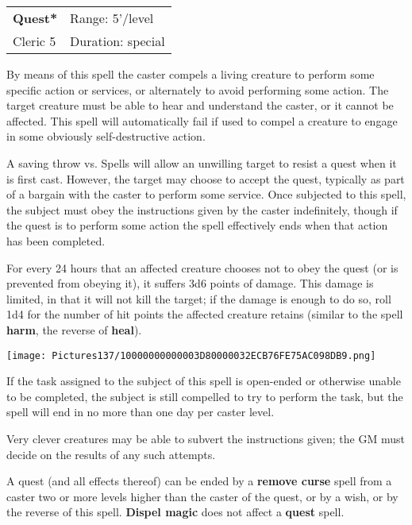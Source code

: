 \documentclass[a4paper,twoside,openany,10pt]{book}
\begin{document}
\begin{multicols}{2}
\smallskip\begin{flushleft} 
	\begin{tabularx}{0.45\textwidth}{@{}m{3.5cm}m{5.5cm}@{}} 
		\textbf{Quest*} & Range: 5'/level\\
Cleric 5 &Duration: special\\
	\end{tabularx}\end{flushleft}

By means of this spell the caster compels a living creature to perform some specific action or services, or alternately to avoid performing some action. The target creature must be able to hear and understand the caster, or it cannot be affected. This spell will automatically fail if used to compel a creature to engage in some obviously self-destructive action.

A saving throw vs. Spells will allow an unwilling target to resist a quest when it is first cast. However, the target may choose to accept the quest, typically as part of a bargain with the caster to perform some service. Once subjected to this spell, the subject must obey the instructions given by the caster indefinitely, though if the quest is to perform some action the spell effectively ends when that action has been completed.

For every 24 hours that an affected creature chooses not to obey the quest (or is prevented from obeying it), it suffers 3d6 points of damage. This damage is limited, in that it will not kill the target; if the damage is enough to do so, roll 1d4 for the number of hit points the affected creature retains (similar to the spell \textbf{harm}, the reverse of \textbf{heal}).


\begin{flushleft}
	\texttt{[image: Pictures137/10000000000003D80000032ECB76FE75AC098DB9.png]}
\end{flushleft}

If the task assigned to the subject of this spell is open-ended or otherwise unable to be completed, the subject is still compelled to try to perform the task, but the spell will end in no more than one day per caster level.

Very clever creatures may be able to subvert the instructions given; the GM must decide on the results of any such attempts.

A quest (and all effects thereof) can be ended by a \textbf{remove curse} spell from a caster two or more levels higher than the caster of the quest, or by a wish, or by the reverse of this spell. \textbf{Dispel magic} does not affect a \textbf{quest }spell.




\end{multicols}
\end{document}
